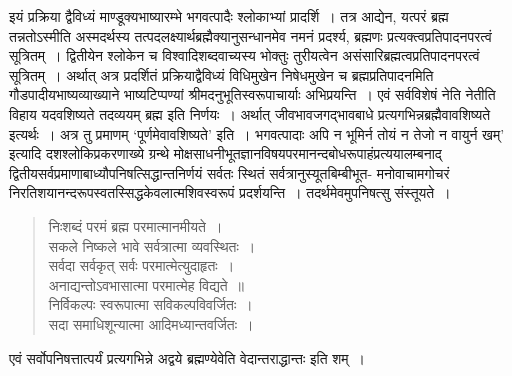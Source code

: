 {इयं प्रक्रिया द्वैविध्यं माण्डूक्यभाष्यारम्भे भगवत्पादैः श्लोकाभ्यां प्रादर्शि~। तत्र आद्येन, यत्परं ब्रह्म तन्नतोऽस्मीति अस्मदर्थस्य तत्पदलक्ष्यार्थब्रह्मैक्यानुसन्धानमेव नमनं प्रदर्श्य, ब्रह्मणः प्रत्यक्त्वप्रतिपादनपरत्वं सूत्रितम्~। द्वितीयेन श्लोकेन च विश्वादिशब्दवाच्यस्य भोक्तुः तुरीयत्वेन असंसारिब्रह्मत्वप्रतिपादनपरत्वं सूत्रितम्~। अर्थात् अत्र प्रदर्शितं प्रक्रियाद्वैविध्यं विधिमुखेन निषेधमुखेन च ब्रह्मप्रतिपादनमिति गौडपादीयभाष्यव्याख्याने भाष्यटिप्पण्यां श्रीमदनुभूतिस्वरूपाचार्याः अभिप्रयन्ति~। एवं सर्वविशेषं नेति नेतीति विहाय यदवशिष्यते तदव्ययम् ब्रह्म इति निर्णयः~। अर्थात् जीवभावजगद्भावबाधे प्रत्यगभिन्नब्रह्मैवावशिष्यते इत्यर्थः~। अत्र तु प्रमाणम् ‘पूर्णमेवावशिष्यते' इति~। भगवत्पादाः अपि न भूमिर्न तोयं न तेजो न वायुर्न खम्' इत्यादि दशश्लोकिप्रकरणाख्ये ग्रन्थे मोक्षसाधनीभूतज्ञानविषयपरमानन्दबोधरूपाहंप्रत्ययालम्बनाद् द्वितीयसर्वप्रमाणाबाध्यौपनिषत्सिद्धान्तनिर्णयं सर्वतः स्थितं सर्वत्रानुस्यूतबिम्बीभूत- मनोवाचामगोचरं निरतिशयानन्दरूपस्वतस्सिद्धकेवलात्मशिवस्वरूपं प्रदर्शयन्ति~। तदर्थमेवमुपनिषत्सु संस्तूयते~। 

\begin{verse}
निःशब्दं परमं ब्रह्म परमात्मानमीयते~। \\
सकले निष्कले भावे सर्वत्रात्मा व्यवस्थितः~। \\
सर्वदा सर्वकृत् सर्वः परमात्मेत्युदाहृतः~। \\
अनाद्यन्तोऽवभासात्मा परमात्मेह विद्यते~॥\\
निर्विकल्पः स्वरूपात्मा सविकल्पविवर्जितः~। \\
सदा समाधिशून्यात्मा आदिमध्यान्तवर्जितः~। 
\end{verse}

एवं सर्वोपनिषत्तात्पर्यं प्रत्यगभिन्ने अद्वये ब्रह्मण्येवेति वेदान्तराद्धान्तः  इति शम्~। 

\articleend
}
